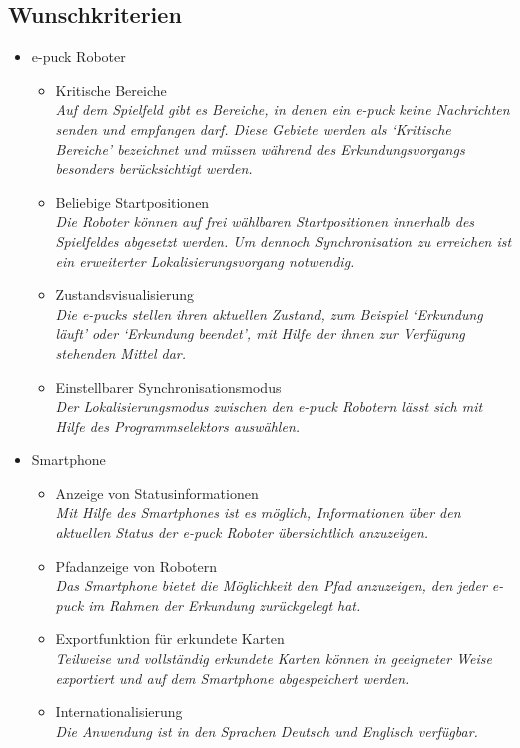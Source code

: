 \documentclass[10pt,a4paper]{article}
\begin{document}
		\subsection{Wunschkriterien}
			\begin{itemize}
				\item e-puck Roboter
				\begin{itemize}
					\item Kritische Bereiche
						\\ \textsl{Auf dem Spielfeld gibt es Bereiche, in denen ein e-puck keine Nachrichten senden
							und empfangen darf. Diese Gebiete werden als `Kritische Bereiche' bezeichnet und müssen
							während des Erkundungsvorgangs besonders berücksichtigt werden.}											
					\item Beliebige Startpositionen
						\\ \textsl{Die Roboter können auf frei wählbaren Startpositionen innerhalb des Spielfeldes
							abgesetzt werden. Um dennoch Synchronisation zu erreichen ist ein erweiterter Lokalisierungsvorgang
							notwendig.}
					\item Zustandsvisualisierung
						\\ \textsl{Die e-pucks stellen ihren aktuellen Zustand, zum Beispiel `Erkundung läuft' oder `Erkundung
							beendet', mit Hilfe der ihnen zur Verfügung stehenden Mittel dar.}												
					\item Einstellbarer Synchronisationsmodus
						\\ \textsl{Der Lokalisierungsmodus zwischen den e-puck Robotern lässt sich mit Hilfe des Programmselektors auswählen.}		
				\end{itemize}
				\item Smartphone
				\begin{itemize}
					\item Anzeige von Statusinformationen
						\\ \textsl{Mit Hilfe des Smartphones ist es möglich, Informationen über den aktuellen Status der e-puck Roboter
							übersichtlich anzuzeigen.}		
					\item Pfadanzeige von Robotern
						\\ \textsl{Das Smartphone bietet die Möglichkeit den Pfad anzuzeigen, den jeder e-puck im Rahmen der
							Erkundung zurückgelegt hat.}							
					\item Exportfunktion für erkundete Karten
						\\ \textsl{Teilweise und vollständig erkundete Karten können in geeigneter Weise exportiert und auf dem
							Smartphone abgespeichert werden.}		
					\item Internationalisierung
						\\ \textsl{Die Anwendung ist in den Sprachen Deutsch und Englisch verfügbar.}									
				\end{itemize}
			\end{itemize}
\end{document}
